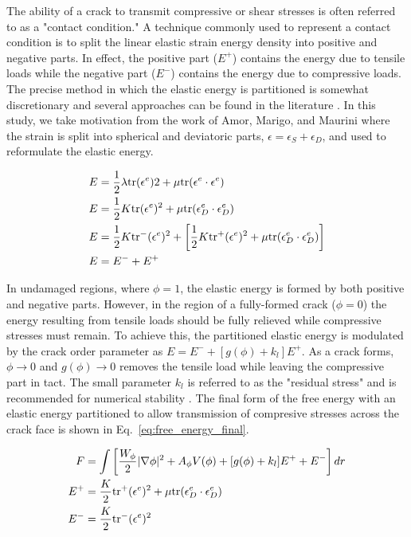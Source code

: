 The ability of a crack to transmit compressive or shear stresses is often referred to as a "contact condition." A technique commonly used to represent a contact condition is to split the linear elastic strain energy density into positive and negative parts. In effect, the positive part ($E^+$) contains the energy due to tensile loads while the negative part ($E^-$) contains the energy due to compressive loads. The precise method in which the elastic energy is partitioned is somewhat discretionary and several approaches can be found in the literature \cite{Lancioni2009} \cite{Amor2009} \cite{Miehe2010}. In this study, we take motivation from the work of Amor, Marigo, and Maurini \cite{Amor2009} where the strain is split into spherical and deviatoric parts, $\epsilon = \epsilon_S + \epsilon_D$, and used to reformulate the elastic energy.

\begin{align}\label{eq:energy_split}
E &= \frac{1}{2}\lambda \text{tr}(\epsilon^e)2 + \mu \text{tr}(\epsilon^e\cdot\epsilon^e)\\
E &= \frac{1}{2}K\text{tr}(\epsilon^e)^2 + \mu\text{tr}(\epsilon_D^e\cdot\epsilon_D^e)\\
E &= \frac{1}{2}K\text{tr}^-(\epsilon^e)^2 + \left[ \frac{1}{2}K\text{tr}^+(\epsilon^e)^2 + \mu\text{tr}(\epsilon_D^e\cdot\epsilon_D^e)\right]\\
E &= E^- + E^+
\end{align}

In undamaged regions, where $\phi=1$, the elastic energy is formed by both positive and negative parts. However, in the region of a fully-formed crack ($\phi = 0$) the energy resulting from tensile loads should be fully relieved while compressive stresses must remain. To achieve this, the partitioned elastic energy is modulated by the crack order parameter as $E = E^- + [g(\phi)+k_l]E^+$. As a crack forms, $\phi\rightarrow 0$ and $g(\phi)\rightarrow 0$ removes the tensile load while leaving the compressive part in tact. The small parameter $k_l$ is referred to as the "residual stress" and is recommended for numerical stability \cite{Amor2009}. The final form of the free energy with an elastic energy partitioned to allow transmission of compresive stresses across the crack face is shown in Eq.~\ref{eq:free_energy_final}.

\begin{align}\label{eq:free_energy_final}
	F &= \int \left[ \frac{W_{\phi}}{2}|\nabla\phi|^2 + A_{\phi}V(\phi) + [g(\phi)+k_l]E^+ + E^-\right]dr\\
	E^+ &= \frac{K}{2} \text{tr}^+(\epsilon^e)^2 + \mu\text{tr}(\epsilon_D^e\cdot\epsilon_D^e)\\
	E^- &= \frac{K}{2} \text{tr}^-(\epsilon^e)^2
\end{align}

